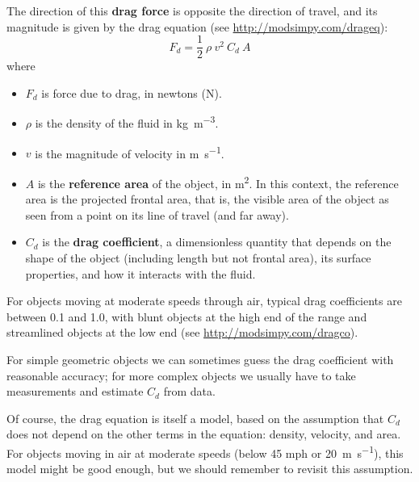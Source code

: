 \documentclass[12pt]{book}
\theoremstyle{exercise}
\begin{document}

The direction of this {\bf drag force} is opposite the direction of travel, and its magnitude is given by the drag equation (see \url{http://modsimpy.com/drageq}):
%
\[ F_d = \frac{1}{2}~\rho~v^2~C_d~A \]
%
where

\begin{itemize}

\item $F_d$ is force due to drag, in newtons (\si{\newton}).

\item $\rho$ is the density of the fluid in \si{\kg\per\meter\cubed}.

\item $v$ is the magnitude of velocity in \si{\meter\per\second}.

\item $A$ is the {\bf reference area} of the object, in \si{\meter\squared}.  In this context, the reference area is the projected frontal area, that is, the visible area of the object as seen from a point on its line of travel (and far away).


\item $C_d$ is the {\bf drag coefficient}, a dimensionless quantity that depends on the shape of the object (including length but not frontal area), its surface properties, and how it interacts with the fluid.


\end{itemize}

For objects moving at moderate speeds through air, typical drag coefficients are between 0.1 and 1.0, with blunt objects at the high end of the range and streamlined objects at the low end (see \url{http://modsimpy.com/dragco}).

For simple geometric objects we can sometimes guess the drag coefficient with reasonable accuracy; for more complex objects we usually have to take measurements and estimate $C_d$ from data.

Of course, the drag equation is itself a model, based on the assumption that $C_d$ does not depend on the other terms in the equation: density, velocity, and area.  For objects moving in air at moderate speeds (below 45 mph or \SI{20}{\meter\per\second}), this model might be good enough, but we should remember to revisit this assumption.
\end{document}
